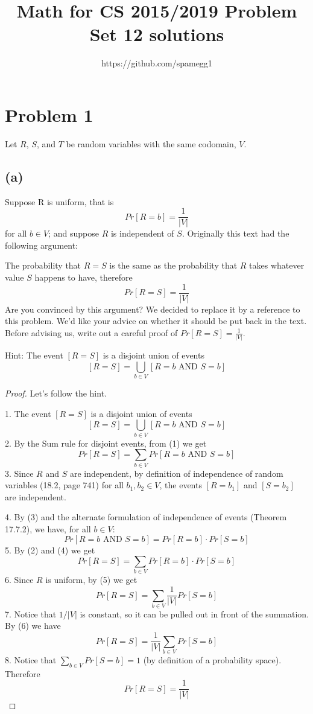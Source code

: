 \documentclass[14pt]{extarticle}
\title{Math for CS 2015/2019 Problem Set 12 solutions}
\author{https://github.com/spamegg1}
\begin{document}
\maketitle
\tableofcontents

\section{Problem 1}
Let $R$, $S$, and $T$ be random variables with the same codomain, $V$.
\subsection{(a)}
Suppose R is uniform, that is
$$
Pr[R = b] = \frac{1}{|V|}
$$
for all $b \in V$; and suppose $R$ is independent of $S$. Originally this text had the following argument:

The probability that $R = S$ is the same as the probability that $R$ takes whatever value $S$ happens to have, therefore
$$
Pr[R = S] = \frac{1}{|V|}
$$
Are you convinced by this argument? We decided to replace it by a reference to this problem. We’d like your advice on whether it should be put back in the text. Before advising us, write out a careful proof of $Pr[R = S] = \frac{1}{|V|}$.

Hint: The event $[R = S]$ is a disjoint union of events
$$
[R = S] = \bigcup_{b \in V}[R = b \text{ AND } S = b]
$$
\begin{proof}
Let's follow the hint.

1. The event $[R = S]$ is a disjoint union of events
$$
[R = S] = \bigcup_{b \in V}[R = b \text{ AND } S = b]
$$
2. By the Sum rule for disjoint events, from (1) we get
$$
Pr[R = S] = \sum_{b \in V}Pr[R = b \text{ AND } S = b]
$$
3. Since $R$ and $S$ are independent, by definition of independence of random variables (18.2, page 741) for all $b_1, b_2 \in V$, the events $[R = b_1]$ and $[S = b_2]$ are independent.

4. By (3) and the alternate formulation of independence of events (Theorem 17.7.2), we have, for all $b \in V$:
$$
Pr[R = b \text{ AND } S = b] = Pr[R = b] \cdot Pr[S = b]
$$
5. By (2) and (4) we get
$$
Pr[R = S] = \sum_{b \in V}Pr[R = b] \cdot Pr[S = b]
$$
6. Since $R$ is uniform, by (5) we get
$$
Pr[R = S] = \sum_{b \in V}\frac{1}{|V|} Pr[S = b]
$$
7. Notice that $1 / |V|$ is constant, so it can be pulled out in front of the summation. By (6) we have
$$
Pr[R = S] = \frac{1}{|V|} \sum_{b \in V} Pr[S = b]
$$
8. Notice that $\sum_{b \in V}Pr[S = b] = 1$ (by definition of a probability space). Therefore
$$
Pr[R = S] = \frac{1}{|V|}
$$
\end{proof}
\end{document}
